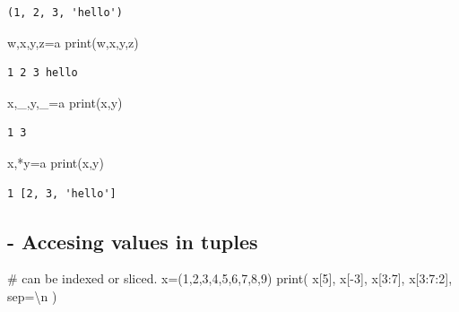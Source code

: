 \documentclass[
  letterpaper,
  DIV=11,
  numbers=noendperiod]{scrreprt}
\newenvironment{Shaded}{\begin{snugshade}}{\end{snugshade}}
\newcommand{\BuiltInTok}[1]{\textcolor[rgb]{0.00,0.23,0.31}{#1}}
\newcommand{\CharTok}[1]{\textcolor[rgb]{0.13,0.47,0.30}{#1}}
\newcommand{\CommentTok}[1]{\textcolor[rgb]{0.37,0.37,0.37}{#1}}
\newcommand{\DecValTok}[1]{\textcolor[rgb]{0.68,0.00,0.00}{#1}}
\newcommand{\NormalTok}[1]{\textcolor[rgb]{0.00,0.23,0.31}{#1}}
\newcommand{\OperatorTok}[1]{\textcolor[rgb]{0.37,0.37,0.37}{#1}}
\newcommand{\StringTok}[1]{\textcolor[rgb]{0.13,0.47,0.30}{#1}}
\begin{document}
\begin{verbatim}
(1, 2, 3, 'hello')
\end{verbatim}

\begin{Shaded}
\begin{Highlighting}[]
\NormalTok{w,x,y,z}\OperatorTok{=}\NormalTok{a}
\BuiltInTok{print}\NormalTok{(w,x,y,z)}
\end{Highlighting}
\end{Shaded}

\begin{verbatim}
1 2 3 hello
\end{verbatim}

\begin{Shaded}
\begin{Highlighting}[]
\NormalTok{x,\_,y,\_}\OperatorTok{=}\NormalTok{a}
\BuiltInTok{print}\NormalTok{(x,y)}
\end{Highlighting}
\end{Shaded}

\begin{verbatim}
1 3
\end{verbatim}

\begin{Shaded}
\begin{Highlighting}[]
\NormalTok{x,}\OperatorTok{*}\NormalTok{y}\OperatorTok{=}\NormalTok{a}
\BuiltInTok{print}\NormalTok{(x,y)}
\end{Highlighting}
\end{Shaded}

\begin{verbatim}
1 [2, 3, 'hello']
\end{verbatim}

\subsection{- Accesing values in
tuples}\label{accesing-values-in-tuples}

\begin{Shaded}
\begin{Highlighting}[]
\CommentTok{\# can be indexed or sliced.}
\NormalTok{x}\OperatorTok{=}\NormalTok{(}\DecValTok{1}\NormalTok{,}\DecValTok{2}\NormalTok{,}\DecValTok{3}\NormalTok{,}\DecValTok{4}\NormalTok{,}\DecValTok{5}\NormalTok{,}\DecValTok{6}\NormalTok{,}\DecValTok{7}\NormalTok{,}\DecValTok{8}\NormalTok{,}\DecValTok{9}\NormalTok{)}
\BuiltInTok{print}\NormalTok{(}
\NormalTok{    x[}\DecValTok{5}\NormalTok{],}
\NormalTok{    x[}\OperatorTok{{-}}\DecValTok{3}\NormalTok{],}
\NormalTok{    x[}\DecValTok{3}\NormalTok{:}\DecValTok{7}\NormalTok{],}
\NormalTok{    x[}\DecValTok{3}\NormalTok{:}\DecValTok{7}\NormalTok{:}\DecValTok{2}\NormalTok{],}
\NormalTok{    sep}\OperatorTok{=}\StringTok{\textquotesingle{}}\CharTok{\textbackslash{}n}\StringTok{\textquotesingle{}}
\NormalTok{)}
\end{Highlighting}
\end{Shaded}
\end{document}
